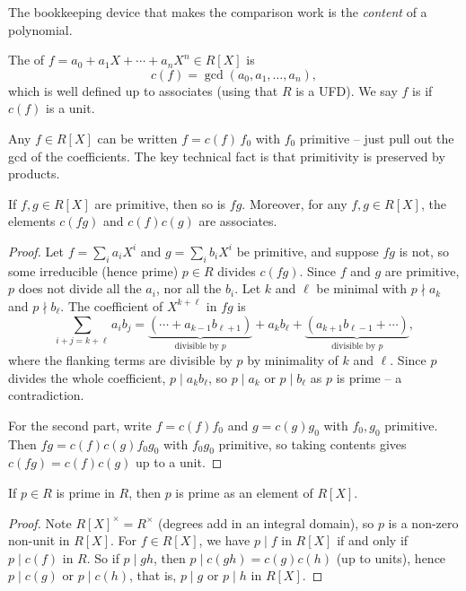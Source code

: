 The bookkeeping device that makes the comparison work is the \emph{content} of a polynomial.

\begin{definition}
	The  of $f = a_0 + a_1 X + \cdots + a_n X^n \in R[X]$ is
	$$
	c(f) = \gcd(a_0, a_1, \dots, a_n),
	$$
	which is well defined up to associates (using that $R$ is a UFD). We say $f$ is  if $c(f)$ is a unit.
\end{definition}

Any $f \in R[X]$ can be written $f = c(f)\, f_0$ with $f_0$ primitive -- just pull out the gcd of the coefficients. The key technical fact is that primitivity is preserved by products.

\begin{lemma}
	If $f, g \in R[X]$ are primitive, then so is $fg$. Moreover, for any $f, g \in R[X]$, the elements $c(fg)$ and $c(f)c(g)$ are associates.
\end{lemma}
\begin{proof}
	Let $f = \sum_{i} a_i X^i$ and $g = \sum_{i} b_i X^i$ be primitive, and suppose $fg$ is not, so some irreducible (hence prime) $p \in R$ divides $c(fg)$. Since $f$ and $g$ are primitive, $p$ does not divide all the $a_i$, nor all the $b_i$. Let $k$ and $\ell$ be minimal with $p \nmid a_k$ and $p \nmid b_\ell$. The coefficient of $X^{k + \ell}$ in $fg$ is
	$$
	\sum_{i + j = k + \ell} a_i b_j = \underbrace{(\cdots + a_{k - 1}b_{\ell + 1})}_{\text{divisible by } p} + a_k b_\ell + \underbrace{(a_{k+1}b_{\ell - 1} + \cdots)}_{\text{divisible by } p},
	$$
	where the flanking terms are divisible by $p$ by minimality of $k$ and $\ell$. Since $p$ divides the whole coefficient, $p \mid a_k b_\ell$, so $p \mid a_k$ or $p \mid b_\ell$ as $p$ is prime -- a contradiction.

	For the second part, write $f = c(f)f_0$ and $g = c(g)g_0$ with $f_0, g_0$ primitive. Then $fg = c(f)c(g) f_0 g_0$ with $f_0 g_0$ primitive, so taking contents gives $c(fg) = c(f)c(g)$ up to a unit.
\end{proof}

\begin{corollary}
	If $p \in R$ is prime in $R$, then $p$ is prime as an element of $R[X]$.
\end{corollary}
\begin{proof}
	Note $R[X]^{\times} = R^{\times}$ (degrees add in an integral domain), so $p$ is a non-zero non-unit in $R[X]$. For $f \in R[X]$, we have $p \mid f$ in $R[X]$ if and only if $p \mid c(f)$ in $R$. So if $p \mid gh$, then $p \mid c(gh) = c(g)c(h)$ (up to units), hence $p \mid c(g)$ or $p \mid c(h)$, that is, $p \mid g$ or $p \mid h$ in $R[X]$.
\end{proof}

